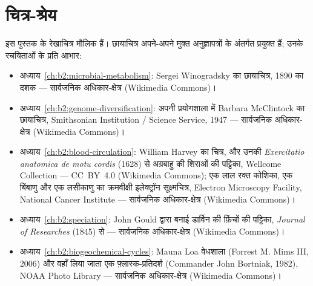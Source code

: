\chapter*{चित्र-श्रेय}

\begingroup\sloppy

इस पुस्तक के रेखाचित्र मौलिक हैं। छायाचित्र अपने-अपने मुक्त अनुज्ञापत्रों के
अंतर्गत प्रयुक्त हैं; उनके रचयिताओं के प्रति आभार:

\begin{itemize}
  \item अध्याय~\ref{ch:b2:microbial-metabolism}: Sergei Winogradsky का
        छायाचित्र, 1890 का दशक --- सार्वजनिक अधिकार-क्षेत्र
        (Wikimedia Commons)।
  \item अध्याय~\ref{ch:b2:genome-diversification}: अपनी प्रयोगशाला में
        Barbara McClintock का छायाचित्र, Smithsonian Institution /
        Science Service, 1947 --- सार्वजनिक अधिकार-क्षेत्र
        (Wikimedia Commons)।
  \item अध्याय~\ref{ch:b2:blood-circulation}: William Harvey का चित्र,
        और उनकी \emph{Exercitatio anatomica de motu cordis} (1628) से
        अग्रबाहु की शिराओं की पट्टिका, Wellcome Collection ---
        CC~BY~4.0 (Wikimedia Commons); एक लाल रक्त कोशिका, एक बिंबाणु
        और एक लसीकाणु का क्रमवीक्षी इलेक्ट्रॉन सूक्ष्मचित्र, Electron
        Microscopy Facility, National Cancer Institute --- सार्वजनिक
        अधिकार-क्षेत्र (Wikimedia Commons)।
  \item अध्याय~\ref{ch:b2:speciation}: John Gould द्वारा बनाई डार्विन
        की फ़िंचों की पट्टिका, \emph{Journal of Researches} (1845) से
        --- सार्वजनिक अधिकार-क्षेत्र (Wikimedia Commons)।
  \item अध्याय~\ref{ch:b2:biogeochemical-cycles}: Mauna Loa वेधशाला
        (Forrest M. Mims III, 2006) और वहाँ लिया जाता एक फ़्लास्क-प्रतिदर्श
        (Commander John Bortniak, 1982), NOAA Photo Library ---
        सार्वजनिक अधिकार-क्षेत्र (Wikimedia Commons)।
\end{itemize}

